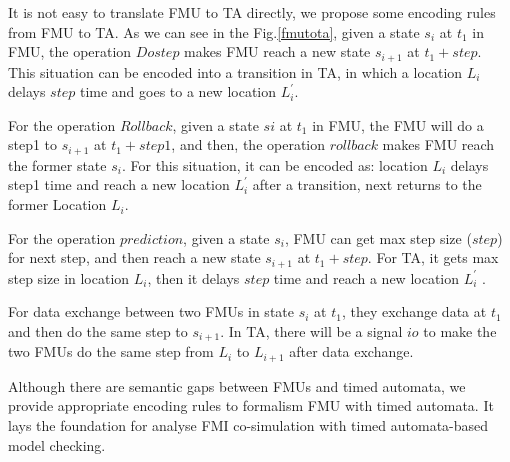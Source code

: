 It is not easy to translate FMU to TA directly, we propose some encoding rules from FMU to TA. As we can see in the Fig.\ref{fmutota}, given a state $s_{i}$ at $t_{1}$ in FMU, the operation $Dostep$ makes FMU reach a new state $s_{i+1}$ at $t_{1}+step$. This situation can be encoded into a transition in TA, in which a location $L_{i}$ delays $step$ time and goes to a new location $L_{i}^{\prime}$.

For the operation $Rollback$, given a state $s{i}$ at $t_{1}$ in FMU, the FMU will do a step1 to $s_{i+1}$ at $t_{1}+step1$, and then, the operation $rollback$ makes FMU reach the former state $s_{i}$. For this situation, it can be encoded as: location $L_{i}$ delays step1 time and reach a new location $L_{i}^{\prime}$ after a transition, next returns to the former Location $L_{i}$. 

For the operation $prediction$, given a state $s_{i}$, FMU can get max step size ($step$) for next step, and then reach a new state $s_{i+1}$ at $t_{1}+step$. For TA, it gets max step size in location $L_{i}$, then it delays $step$ time and reach a new location $L_{i}^{\prime}$ .

For data exchange between two FMUs in state $s_{i}$ at $t_{1}$, they exchange data at $t_{1}$ and then do the same step to $s_{i+1}$. In TA, there will be a signal $io$ to make the two FMUs do the same step from $L_{i}$ to $L_{i+1}$ after data exchange.

Although there are semantic gaps between FMUs and timed automata, we provide appropriate encoding rules to formalism FMU with timed automata. It lays the foundation for analyse FMI co-simulation with timed automata-based model checking.
